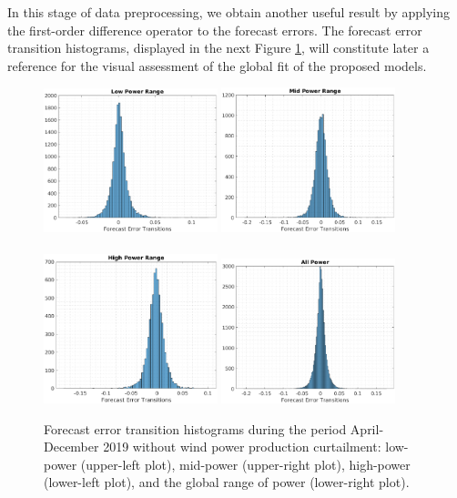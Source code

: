 \documentclass[11pt]{article}
\theoremstyle{definition}
\begin{document}
In this stage of data preprocessing, we obtain another useful result by applying the first-order difference operator to the forecast errors. 
The forecast error transition histograms, displayed in the next Figure \ref{fig:error_transitions}, will constitute later a reference for the visual assessment of the global fit of the proposed models.

\begin{figure}[H]
\centering
\includegraphics[width=0.45\textwidth]{plots/LP_t.eps}
\includegraphics[width=0.45\textwidth]{plots/MP_t.eps}\\
\quad\\
\includegraphics[width=0.45\textwidth]{plots/HP_t.eps}
\includegraphics[width=0.45\textwidth]{plots/AP_t.eps}
\caption{Forecast error transition histograms during the period April-December 2019 without wind power production curtailment: low-power (upper-left plot), mid-power (upper-right plot), high-power (lower-left plot), and the global range of power (lower-right plot).}
\label{fig:error_transitions}
\end{figure}
\end{document}
